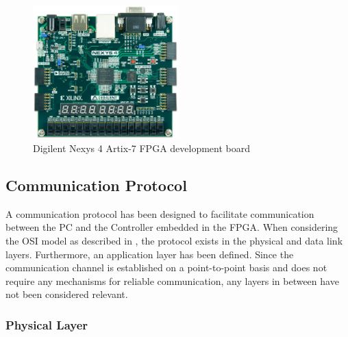 \documentclass[main.tex]{subfiles}
\begin{document}
\begin{figure}[h]
\centering
\includegraphics[width=0.5\textwidth]{img/nexys4-small}
\caption{Digilent Nexys 4 Artix-7 FPGA development board}
\label{fig:nexys4}
\end{figure}



\subsection{Communication Protocol}
\label{section:communication-protocol}
A communication protocol has been designed to facilitate communication between the PC and the Controller embedded in the FPGA. When considering the OSI model as described in \cite[p.28]{tanenbaumcomputer}, the protocol exists in the physical and data link layers. Furthermore, an application layer has been defined. 
Since the communication channel is established on a point-to-point basis and does not require any mechanisms for reliable communication, any layers in between have not been considered relevant.


\subsubsection{Physical Layer}
\end{document}
